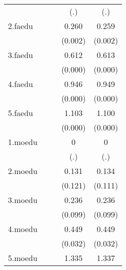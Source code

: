 {\begin{tabular}{l*{4}{c}}
            &                     &                     &         (.)         &         (.)         \\
[1em]
2.faedu     &                     &                     &       0.260\sym{**} &       0.259\sym{**} \\
            &                     &                     &     (0.002)         &     (0.002)         \\
[1em]
3.faedu     &                     &                     &       0.612\sym{***}&       0.613\sym{***}\\
            &                     &                     &     (0.000)         &     (0.000)         \\
[1em]
4.faedu     &                     &                     &       0.946\sym{***}&       0.949\sym{***}\\
            &                     &                     &     (0.000)         &     (0.000)         \\
[1em]
5.faedu     &                     &                     &       1.103\sym{***}&       1.100\sym{***}\\
            &                     &                     &     (0.000)         &     (0.000)         \\
[1em]
1.moedu     &                     &                     &           0         &           0         \\
            &                     &                     &         (.)         &         (.)         \\
[1em]
2.moedu     &                     &                     &       0.131         &       0.134         \\
            &                     &                     &     (0.121)         &     (0.111)         \\
[1em]
3.moedu     &                     &                     &       0.236         &       0.236         \\
            &                     &                     &     (0.099)         &     (0.099)         \\
[1em]
4.moedu     &                     &                     &       0.449\sym{*}  &       0.449\sym{*}  \\
            &                     &                     &     (0.032)         &     (0.032)         \\
[1em]
5.moedu     &                     &                     &       1.335\sym{**} &       1.337\sym{**} \\

\end{tabular}}

